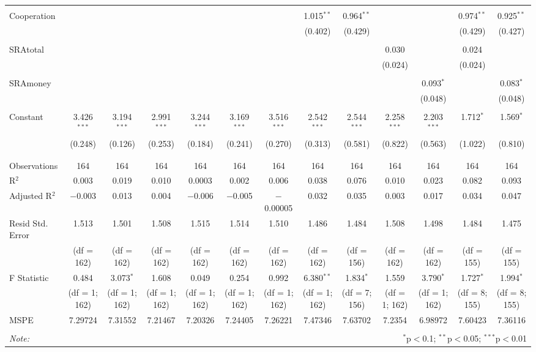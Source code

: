 \begin{table}[H]
\begin{adjustbox}{width=\textwidth}
\begin{tabular}{@{\extracolsep{5pt}}lcccccccccccc}
  & & & & & & & & & & & & \\ 
 Cooperation &  &  &  &  &  &  & 1.015$^{**}$ & 0.964$^{**}$ &  &  & 0.974$^{**}$ & 0.925$^{**}$ \\ 
  &  &  &  &  &  &  & (0.402) & (0.429) &  &  & (0.429) & (0.427) \\ 
  & & & & & & & & & & & & \\ 
 SRAtotal &  &  &  &  &  &  &  &  & 0.030 &  & 0.024 &  \\ 
  &  &  &  &  &  &  &  &  & (0.024) &  & (0.024) &  \\ 
  & & & & & & & & & & & & \\ 
 SRAmoney &  &  &  &  &  &  &  &  &  & 0.093$^{*}$ &  & 0.083$^{*}$ \\ 
  &  &  &  &  &  &  &  &  &  & (0.048) &  & (0.048) \\ 
  & & & & & & & & & & & & \\ 
 Constant & 3.426$^{***}$ & 3.194$^{***}$ & 2.991$^{***}$ & 3.244$^{***}$ & 3.169$^{***}$ & 3.516$^{***}$ & 2.542$^{***}$ & 2.544$^{***}$ & 2.258$^{***}$ & 2.203$^{***}$ & 1.712$^{*}$ & 1.569$^{*}$ \\ 
  & (0.248) & (0.126) & (0.253) & (0.184) & (0.241) & (0.270) & (0.313) & (0.581) & (0.822) & (0.563) & (1.022) & (0.810) \\ 
  & & & & & & & & & & & & \\ 
\hline \\[-1.8ex] 
Observations & 164 & 164 & 164 & 164 & 164 & 164 & 164 & 164 & 164 & 164 & 164 & 164 \\ 
R$^{2}$ & 0.003 & 0.019 & 0.010 & 0.0003 & 0.002 & 0.006 & 0.038 & 0.076 & 0.010 & 0.023 & 0.082 & 0.093 \\ 
Adjusted R$^{2}$ & $-$0.003 & 0.013 & 0.004 & $-$0.006 & $-$0.005 & $-$0.00005 & 0.032 & 0.035 & 0.003 & 0.017 & 0.034 & 0.047 \\ 
Resid Std. Error & 1.513 & 1.501 & 1.508 & 1.515  & 1.514 & 1.510 & 1.486  & 1.484 & 1.508 & 1.498 & 1.484  & 1.475\\ 
& (df = 162) & (df = 162) & (df = 162) & (df = 162) & (df = 162) & (df = 162) & (df = 162) & (df = 156) & (df = 162) & (df = 162) & (df = 155) & (df = 155) \\
F Statistic & 0.484  & 3.073$^{*}$  & 1.608  & 0.049  & 0.254 & 0.992  & 6.380$^{**}$  & 1.834$^{*}$  & 1.559  & 3.790$^{*}$ & 1.727$^{*}$  & 1.994$^{*}$  \\ 
& (df = 1; 162) & (df = 1; 162) & (df = 1; 162) & (df = 1; 162) & (df = 1; 162) & (df = 1; 162) & (df = 1; 162) & (df = 7; 156) & (df = 1; 162) & (df = 1; 162)  & (df = 8; 155) & (df = 8; 155) \\
MSPE & 7.29724 & 7.31552 & 7.21467 & 7.20326 & 7.24405 & 7.26221 & 7.47346 &7.63702 & 7.2354 & 6.98972 & 7.60423 & 7.36116 \\
\hline 
\hline \\[-1.8ex] 
\textit{Note:}  & \multicolumn{12}{r}{$^{*}$p$<$0.1; $^{**}$p$<$0.05; $^{***}$p$<$0.01} \\ 
\end{tabular} 
\end{adjustbox}
\end{table} 

